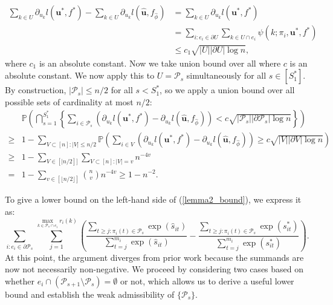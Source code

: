 \documentclass[
  12pt]{article}
\begin{document}
\begin{align}
\sum_{k \in U} \partial_{u_k} l(\boldsymbol{u}^*,f^*)-\sum_{k \in U} \partial_{u_k} l(\widehat{\boldsymbol{u}}, f_{\widehat{\phi}}) & = \sum_{k \in U} \partial_{u_k} l(\boldsymbol{u}^*,f^*) \nonumber\\
& = \sum_{i: e_i \in \partial U} \sum_{k \in U \cap e_i} \psi(k ; \pi_i, \boldsymbol{u}^*,f^*)\nonumber \\
& \leq c_1 \sqrt{|U||\partial U| \log n},\label{lemma2_bound}
\end{align}
\noindent where $c_1$ is an absolute constant. Now we take union bound over all where $c$ is an absolute constant. We now apply this to $U=\mathcal{P}_s$ simultaneously for all $s \in [S_1^*]$. By construction, $|\mathcal{P}_s|\leq n/2$ for all $s<S_1^*$, so we apply a union bound over all possible sets of cardinality at most $n/2$:
$$\begin{aligned}
& \mathbb{P}\left( \bigcap_{s=1}^{S_1^*} \left\{ \sum_{i \in \mathcal{P}_s} \left( \partial_{u_k} l(\boldsymbol{u}^*,f^*) - \partial_{u_k} l(\widehat{\boldsymbol{u}},f_{\widehat{\phi}}) \right) < c \sqrt{ |\mathcal{P}_s| |\partial \mathcal{P}_s| \log n } \right\} \right) \\
\geq & 1-\sum_{V \subset[n]:|V| \leq n / 2} \mathbb{P}\left(\sum_{i \in V}\left(\partial_{u_k} l(\boldsymbol{u}^*,f^*)-\partial_{u_k} l(\widehat{\boldsymbol{u}},f_{\widehat{\phi}})\right) \geq c\sqrt{|V||\partial V| \log n}\right) \\
\geq & 1-\sum_{V \in[\mid n / 2]]} \sum_{V \subset[n]:|V|=v} n^{-4 v} \\
= & 1-\sum_{v \in[\lfloor n / 2\rfloor]}\binom{n}{v} n^{-4 v} 
\geq  1-n^{-2}.
\end{aligned}$$


\noindent To give a lower bound on the left-hand side of (\ref{lemma2_bound}), we express it as:
\begin{equation}
\label{lemma2_summands}
\sum_{i: e_i \in \partial \mathcal{P}_s} \sum_{j=1}^{\max_{k \in \mathcal{P}_s \cap e_i} r_i(k)} \left( \frac{\sum_{t \geq j: \pi_i(t) \in \mathcal{P}_s} \exp(\widehat{s}_{it})}{\sum_{t=j}^{m_i} \exp(\widehat{s}_{it})} - \frac{\sum_{t \geq j: \pi_i(t) \in \mathcal{P}_s} \exp(s_{it}^*)}{\sum_{t=j}^{m_i} \exp(s_{it}^*)} \right).
\end{equation}
\noindent At this point, the argument diverges from prior work \citet{han2025unifiedanalysis} because the summands are now not necessarily non-negative. We proceed by considering two cases based on whether $e_i \cap (\mathcal{P}_{s+1} \setminus \mathcal{P}_s) = \emptyset$ or not, which allows us to derive a useful lower bound and establish the weak admissibility of $\{\mathcal{P}_s\}$. 
\end{document}
